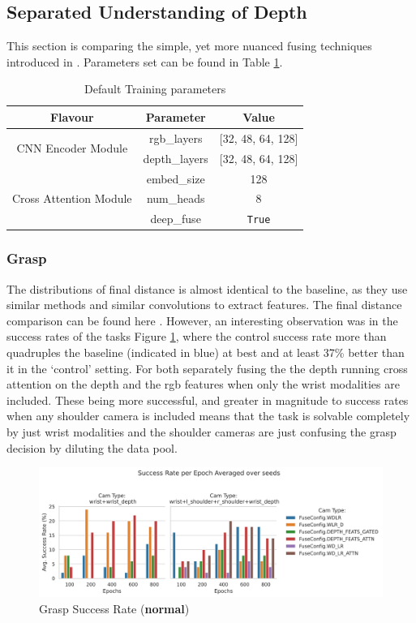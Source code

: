 \subsection{Separated Understanding of Depth}\label{eval:sep-dep}
This section is comparing the simple, yet more nuanced fusing techniques introduced in . Parameters set can be found in Table \ref{tab:sep-dep-params}. 

\begin{table}[H]
\centering
  \begin{tabular}{|| c | c | c ||}
  \hline
  Flavour & Parameter & Value \\
  \hline
  
  \multirow{2}{*}{CNN Encoder Module} & rgb\_layers & [32, 48, 64, 128] \\
  & depth\_layers & [32, 48, 64, 128] \\
  \hline
  \multirow{3}{*}{Cross Attention Module} & embed\_size & 128 \\
  & num\_heads & 8 \\
  & deep\_fuse & \texttt{True} \\
  \hline
  \end{tabular}\caption{Default Training parameters}\label{tab:sep-dep-params}
\end{table}

\subsubsection{Grasp}
The distributions of final distance is almost identical to the baseline, as they use similar methods and similar convolutions to extract features. The final distance comparison can be found here . However, an interesting observation was in the success rates of the tasks Figure \ref{fig:sepdep-normal-success}, where the control success rate more than quadruples the baseline (indicated in blue) at best and at least 37\% better than it in the `control' setting. For both separately fusing the the depth running cross attention on the depth and the rgb features when only the wrist modalities are included. These being more successful, and greater in magnitude to success rates when any shoulder camera is included means that the task is solvable completely by just wrist modalities and the shoulder cameras are just confusing the grasp decision by diluting the data pool.


\begin{figure}[H]
  \centering
  \includegraphics[width=0.7\linewidth]{assets/evaluation/sep-dep/grasp-normal-success-cams.png}
  \caption{Grasp Success Rate (\textbf{normal})}\label{fig:sepdep-normal-success}
\end{figure}

